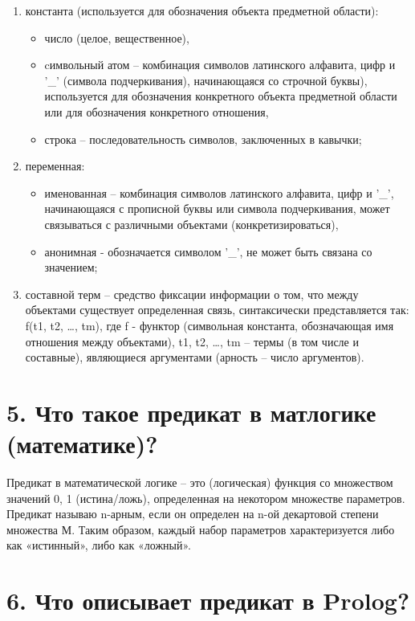 \documentclass[12pt]{report}
\begin{document}
\begin{enumerate}
	\item константа (используется для обозначения объекта предметной области): 
	\begin{itemize}
		\item число (целое, вещественное),
		\item cимвольный атом -- комбинация символов латинского алфавита, цифр и ’\_’ (символа подчеркивания), начинающаяся со строчной буквы), используется для обозначения конкретного объекта предметной области или для обозначения конкретного отношения,
		\item строка -- последовательность символов, заключенных в кавычки;
	\end{itemize}
	\item переменная:
	\begin{itemize}
		\item именованная -- комбинация символов латинского алфавита, цифр и ’\_’, начинающаяся с прописной буквы или символа подчеркивания, может связываться с различными объектами (конкретизироваться),
		\item анонимная  - обозначается символом ’\_’, не может быть связана со значением;
	\end{itemize}
	\item составной терм -- средство фиксации информации о том, что между объектами существует определенная связь,  синтаксически представляется так: f(t1, t2, …, tm), где f -  функтор (символьная константа, обозначающая имя отношения между объектами), t1, t2, …, tm – термы (в том  числе  и составные), являющиеся аргументами (арность -- число аргументов).
\end{enumerate}

\section*{5. Что такое предикат в матлогике (математике)?}

Предикат в математической логике -- это (логическая) функция со множеством значений {0, 1} (истина/ложь), определенная на некотором множестве параметров. Предикат называю n-арным, если он определен на n-ой декартовой степени множества М. Таким образом, каждый набор параметров характеризуется либо как «истинный», либо как «ложный».

\section*{6. Что описывает предикат в Prolog?}
\end{document}
